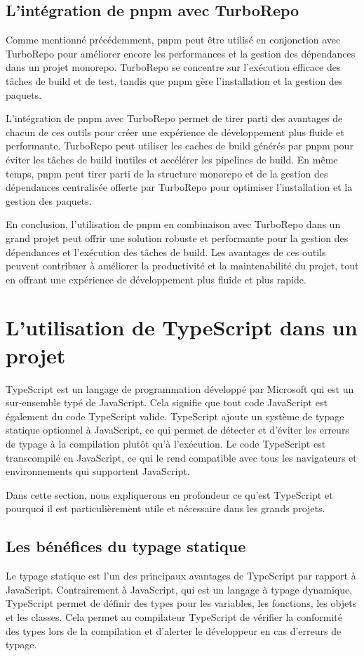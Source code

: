 \subsection{L'intégration de pnpm avec TurboRepo}

Comme mentionné précédemment, \gls{pnpm} peut être utilisé en conjonction avec TurboRepo pour améliorer encore les performances et la gestion des dépendances dans un projet monorepo. TurboRepo se concentre sur l'exécution efficace des tâches de build et de test, tandis que \gls{pnpm} gère l'installation et la gestion des paquets.

L'intégration de \gls{pnpm} avec TurboRepo permet de tirer parti des avantages de chacun de ces outils pour créer une expérience de développement plus fluide et performante. TurboRepo peut utiliser les caches de build générés par \gls{pnpm} pour éviter les tâches de build inutiles et accélérer les pipelines de build. En même temps, \gls{pnpm} peut tirer parti de la structure monorepo et de la gestion des dépendances centralisée offerte par TurboRepo pour optimiser l'installation et la gestion des paquets.

En conclusion, l'utilisation de \gls{pnpm} en combinaison avec TurboRepo dans un grand projet peut offrir une solution robuste et performante pour la gestion des dépendances et l'exécution des tâches de build. Les avantages de ces outils peuvent contribuer à améliorer la productivité et la maintenabilité du projet, tout en offrant une expérience de développement plus fluide et plus rapide.


\section{L'utilisation de TypeScript dans un projet}
TypeScript est un langage de programmation développé par Microsoft qui est un sur-ensemble typé de JavaScript. Cela signifie que tout code JavaScript est également du code TypeScript valide. TypeScript ajoute un système de typage statique optionnel à JavaScript, ce qui permet de détecter et d'éviter les erreurs de typage à la compilation plutôt qu'à l'exécution. Le code TypeScript est transcompilé en JavaScript, ce qui le rend compatible avec tous les navigateurs et environnements qui supportent JavaScript.

Dans cette section, nous expliquerons en profondeur ce qu'est TypeScript et pourquoi il est particulièrement utile et nécessaire dans les grands projets.

\subsection{Les bénéfices du typage statique}
Le typage statique est l'un des principaux avantages de TypeScript par rapport à JavaScript. Contrairement à JavaScript, qui est un langage à typage dynamique, TypeScript permet de définir des types pour les variables, les fonctions, les objets et les classes. Cela permet au compilateur TypeScript de vérifier la conformité des types lors de la compilation et d'alerter le développeur en cas d'erreurs de typage.

